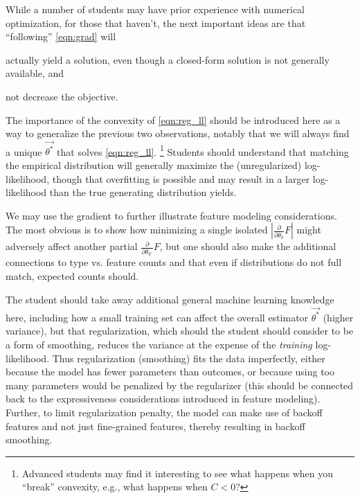 \documentclass[11pt,letterpaper]{article}
\begin{document}
While a number of students may have prior experience with numerical optimization, for those that haven't, the next 
important ideas are that ``following'' \eqref{eqn:grad} will
\begin{inparaenum}[i)]
\item actually yield a solution, even though a closed-form solution is not generally available, and
\item not decrease the objective.
\end{inparaenum}
The importance of the convexity of \eqref{eqn:reg_ll} should be introduced here as a way to generalize the 
previous two observations, notably that we will always find a unique $\vec{\theta^*}$ that solves \eqref{eqn:reg_ll}.
\footnote{Advanced students may find it interesting to see what happens when you ``break'' convexity, e.g., what 
happens when $C < 0$?}
Students should understand that matching the empirical distribution will generally maximize the (unregularized) log-likelihood, 
though that overfitting is possible and may result in a larger log-likelihood than the true generating distribution yields.

We may use the gradient to further illustrate feature modeling considerations. The most obvious is to show how 
minimizing a single isolated $|\frac{\partial}{\partial \theta_k} F|$ might adversely affect another partial 
$\frac{\partial}{\partial \theta_{k'}}F$, but one should also make the additional connections to type vs. feature counts 
and that even if distributions do not full match, expected counts should.

The student should take away additional general machine learning knowledge here, including how a small training set can
affect the overall estimator $\vec{\theta^*}$ (higher variance), but that regularization, which should the student should consider
to be a form of smoothing, reduces the variance at the expense of the \textit{training} log-likelihood. Thus regularization 
(smoothing) fits the data imperfectly, either because the model has fewer parameters than outcomes, or because using too 
many parameters would be penalized by the regularizer (this should be connected back to the expressiveness considerations 
introduced in feature modeling). Further, to limit regularization penalty, the model can make use of backoff features and 
not just fine-grained features, thereby resulting in backoff smoothing.
\end{document}

